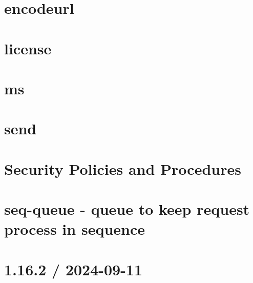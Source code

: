 \documentclass[twoside]{book}
\newcommand{\+}{\discretionary{\mbox{\scriptsize$\hookleftarrow$}}{}{}}
\begin{document}
\chapter{encodeurl}
\label{md_Backend_nodejs_node_modules_send_node_modules_encodeurl_README}

\chapter{license}
\label{md_Backend_nodejs_node_modules_send_node_modules_ms_license}

\chapter{ms}
\label{md_Backend_nodejs_node_modules_send_node_modules_ms_readme}

\chapter{send}
\label{md_Backend_nodejs_node_modules_send_README}

\chapter{Security Policies and Procedures}
\label{md_Backend_nodejs_node_modules_send_SECURITY}

\chapter{seq-\/queue -\/ queue to keep request process in sequence}
\label{md_Backend_nodejs_node_modules_seq_queue_README}

\chapter{1.16.2 / 2024-\/09-\/11}
\label{md_Backend_nodejs_node_modules_serve_static_HISTORY}

\end{document}
